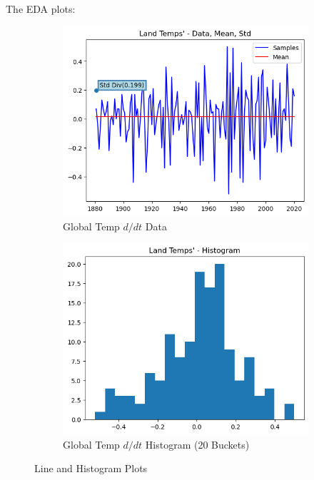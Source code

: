 \documentclass{article}
\begin{document}
The EDA plots:

 \begin{figure}[H]
  \centering
  \begin{subfigure}[b]{0.45\textwidth}
    \includegraphics[width=\textwidth]{img/global_temp_dt/data.png}
    \caption{Global Temp $d/dt$ Data}
    \label{fig:global_temp_dtlines}
  \end{subfigure}
  \hfill
  \begin{subfigure}[b]{0.45\textwidth}
    \includegraphics[width=\textwidth]{img/global_temp_dt/histogram.png}
    \caption{Global Temp $d/dt$ Histogram (20 Buckets)}
    \label{fig:global_temp_dthist}
  \end{subfigure}
  \caption{Line and Histogram Plots}
  \label{fig:global_temp_dt1}
\end{figure}
\end{document}
